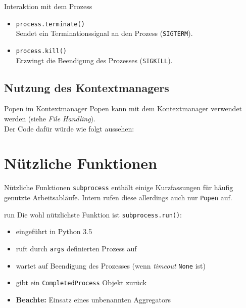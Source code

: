 \begin{frame}[fragile]{Interaktion mit dem Prozess}
	\begin{itemize}
		\item \texttt{process.terminate()} \\
			Sendet ein Terminationssignal an den Prozess (\texttt{SIGTERM}).
		\item \texttt{process.kill()} \\
			Erzwingt die Beendigung des Prozesses (\texttt{SIGKILL}).
	\end{itemize}
\end{frame}

\subsection{Nutzung des Kontextmanagers}
\begin{frame}{Popen im Kontextmanager}
	Popen kann mit dem Kontextmanager verwendet werden (siehe \textit{File Handling}). \\
	Der Code daf\"ur w\"urde wie folgt aussehen:
	
\end{frame}

\section{N\"utzliche Funktionen}
\begin{frame}[fragile]{N\"utzliche Funktionen}
	\texttt{subprocess} enth\"alt einige Kurzfassungen f\"ur h\"aufig genutzte Arbeitsabl\"aufe.
	Intern rufen diese allerdings auch nur \texttt{Popen} auf.
\end{frame}

\begin{frame}[fragile]{run}
	Die wohl n\"utzlichste Funktion ist \texttt{subprocess.run()}:
	
	\begin{itemize}
		\item eingef\"uhrt in Python 3.5
		\item ruft durch \texttt{args} definierten Prozess auf
		\item wartet auf Beendigung des Prozesses (wenn \textit{timeout} \texttt{None} ist)
		\item gibt ein \texttt{CompletedProcess} Objekt zur\"uck
		\item \textbf{Beachte:} Einsatz eines unbenannten Aggregators
	\end{itemize}
\end{frame}

